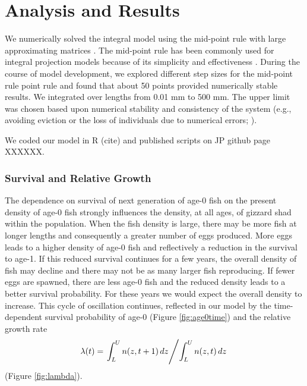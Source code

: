 \documentclass[11pt,oneside]{amsart}
\theoremstyle{definition}
\begin{document}
\section{Analysis and Results}
We numerically solved the integral model using the mid-point rule with large approximating matrices \citep{burden2005numerical}. The mid-point rule has been commonly used for integral projection models because of its simplicity and effectiveness \citep{ellner2006integral, ramula2009integral,  merow2014advancing}. During the course of model development, we explored different step sizes for the mid-point rule point rule and found that about 50 points provided numerically stable results. We integrated over lengths from 0.01 mm to 500 mm. The upper limit was chosen based upon numerical stability and consistency of the system (e.g., avoiding eviction or the loss of individuals due to numerical errors; \citep{williams2012avoiding}). 

We coded our model in R (cite) and published scripts on JP github page XXXXXX.

\subsubsection{Survival and Relative Growth}
The dependence on survival of next generation of age-0 fish on the present density of age-0 fish strongly influences the density, at all ages, of gizzard shad within the population. When the fish density is large, there may be more fish at longer lengths and consequently a greater number of eggs produced.  More eggs leads to a higher density of age-0 fish and reflectively a reduction in the survival to age-1.  If this reduced survival continues for a few years, the overall density of fish may decline and there may not be as many larger fish reproducing.  If fewer eggs are spawned, there are less age-0 fish and the reduced density leads to a better survival probability.  For these years we would expect the overall density to increase.  This cycle of oscillation continues, reflected in our model by the time-dependent survival probability of age-0 (Figure \ref{fig:age0time}) and the relative growth rate 
$$ \lambda(t) = \left. \int_L^U n(z,t+1) \, dz \middle/ \int_L^U n(z,t) \, dz \right.$$ (Figure \ref{fig:lambda}).
\end{document}
